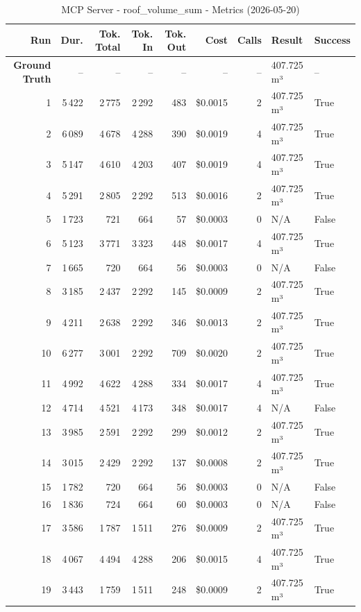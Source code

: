 \documentclass[a4paper,11pt]{article}
\begin{document}
\begin{table}[ht]
\centering
\scriptsize
\caption{MCP Server - roof\_volume\_sum - Metrics (2026-05-20)}
\label{tab:mcp\_roof\_volume\_sum\_metrics\_2026-05-20}
\begin{tabular}{r r r r r r r p{3cm} l}
\hline
Run & Dur. & Tok. Total & Tok. In & Tok. Out & Cost & Calls & Result & Success \\
\hline
\textbf{Ground Truth} & -- & -- & -- & -- & -- & -- & 407.725 m³ & -- \\
\hline
1 & 5\,422 & 2\,775 & 2\,292 & 483 & \$0.0015 & 2 & 407.725 m³ & True \\
2 & 6\,089 & 4\,678 & 4\,288 & 390 & \$0.0019 & 4 & 407.725 m³ & True \\
3 & 5\,147 & 4\,610 & 4\,203 & 407 & \$0.0019 & 4 & 407.725 m³ & True \\
4 & 5\,291 & 2\,805 & 2\,292 & 513 & \$0.0016 & 2 & 407.725 m³ & True \\
5 & 1\,723 & 721 & 664 & 57 & \$0.0003 & 0 & N/A & False \\
6 & 5\,123 & 3\,771 & 3\,323 & 448 & \$0.0017 & 4 & 407.725 m³ & True \\
7 & 1\,665 & 720 & 664 & 56 & \$0.0003 & 0 & N/A & False \\
8 & 3\,185 & 2\,437 & 2\,292 & 145 & \$0.0009 & 2 & 407.725 m³ & True \\
9 & 4\,211 & 2\,638 & 2\,292 & 346 & \$0.0013 & 2 & 407.725 m³ & True \\
10 & 6\,277 & 3\,001 & 2\,292 & 709 & \$0.0020 & 2 & 407.725 m³ & True \\
11 & 4\,992 & 4\,622 & 4\,288 & 334 & \$0.0017 & 4 & 407.725 m³ & True \\
12 & 4\,714 & 4\,521 & 4\,173 & 348 & \$0.0017 & 4 & N/A & False \\
13 & 3\,985 & 2\,591 & 2\,292 & 299 & \$0.0012 & 2 & 407.725 m³ & True \\
14 & 3\,015 & 2\,429 & 2\,292 & 137 & \$0.0008 & 2 & 407.725 m³ & True \\
15 & 1\,782 & 720 & 664 & 56 & \$0.0003 & 0 & N/A & False \\
16 & 1\,836 & 724 & 664 & 60 & \$0.0003 & 0 & N/A & False \\
17 & 3\,586 & 1\,787 & 1\,511 & 276 & \$0.0009 & 2 & 407.725 m³ & True \\
18 & 4\,067 & 4\,494 & 4\,288 & 206 & \$0.0015 & 4 & 407.725 m³ & True \\
19 & 3\,443 & 1\,759 & 1\,511 & 248 & \$0.0009 & 2 & 407.725 m³ & True \\

\end{tabular}
\end{table}
\end{document}
